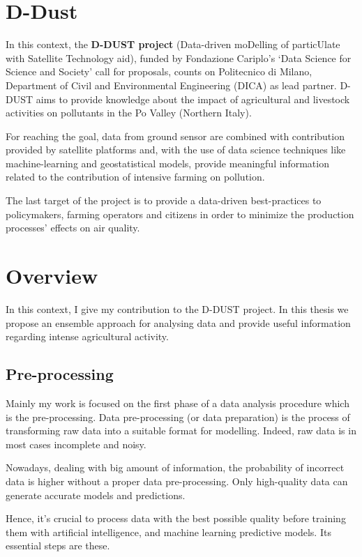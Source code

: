 \section{D-Dust}
In this context, the \textbf{D-DUST project} (Data-driven moDelling of particUlate with Satellite Technology aid), funded by Fondazione Cariplo’s ‘Data Science for Science and Society’ call for proposals, counts on Politecnico di Milano, Department of Civil and Environmental Engineering (DICA) as lead partner.\newline
D-DUST aims to provide knowledge about the impact of agricultural and livestock activities on pollutants in the Po Valley (Northern Italy).\par 
For reaching the goal, data from ground sensor are combined with contribution provided by satellite platforms and, with the use of data science techniques like machine-learning and geostatistical models, provide meaningful information related to the contribution of intensive farming on pollution.\par
The last target of the project is to provide a data-driven best-practices to policymakers, farming operators and citizens in order to minimize the production processes' effects on air quality.
\section{Overview}
In this context, I give my contribution to the D-DUST project. In this thesis we propose an ensemble approach for analysing data and provide useful information regarding intense agricultural activity. \par
\subsection{Pre-processing}
Mainly my work is focused on the first phase of a data analysis procedure which is the pre-processing.
Data pre-processing (or data preparation) is the process of transforming raw data into a suitable format for modelling. 
Indeed, raw data is in most cases incomplete and noisy.\par
Nowadays, dealing with big amount of information, the probability of incorrect data is higher without a proper data pre-processing.
Only high-quality data can generate accurate models and predictions. \par
Hence, it’s crucial to process data with the best possible quality before training them with artificial intelligence, and machine learning predictive models.
Its essential steps are these.

